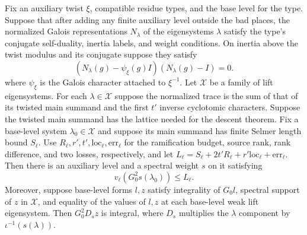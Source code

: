 \begin{lemma}
\label{lem:c-base-denominator}
\emitthmsource
Fix an auxiliary twist $\xi$, compatible residue types, and the base level for the type. Suppose that after adding any finite auxiliary level outside the bad places, the normalized Galois representations $N_\lambda$ of the eigensystems $\lambda$ satisfy the type's conjugate self-duality, inertia labels, and weight conditions. On inertia above the twist modulus and its conjugate suppose they satisfy
\[
 (N_\lambda(g)-\psi_\xi(g)I)(N_\lambda(g)-I)=0 .
\]
where $\psi_\xi$ is the Galois character attached to $\xi^{-1}$. Let $\mathcal X$ be a family of lift eigensystems. For each $\lambda\in\mathcal X$ suppose the normalized trace is the sum of that of its twisted main summand and the first $t'$ inverse cyclotomic characters. Suppose the twisted main summand has the lattice needed for the descent theorem. Fix a base-level system $\lambda_0\in\mathcal X$ and suppose its main summand has finite Selmer length bound $S_\ell$. Use $R_\ell,r',t',\mathrm{loc}_\ell,\mathrm{err}_\ell$ for the ramification budget, source rank, rank difference, and two losses, respectively, and let $L_\ell=S_\ell+2t'R_\ell+r'\mathrm{loc}_\ell+\mathrm{err}_\ell$. Then there is an auxiliary level and a spectral weight $s$ on it satisfying
\[
 v_\ell(G_0^2s(\lambda_0))\le L_\ell.
\]
Moreover, suppose base-level forms $l,z$ satisfy integrality of $G_0l$, spectral support of $z$ in $\mathcal X$, and equality of the values of $l,z$ at each base-level weak lift eigensystem. Then $G_0^2D_s z$ is integral, where $D_s$ multiplies the $\lambda$ component by $\iota^{-1}(s(\lambda))$.
\end{lemma}
